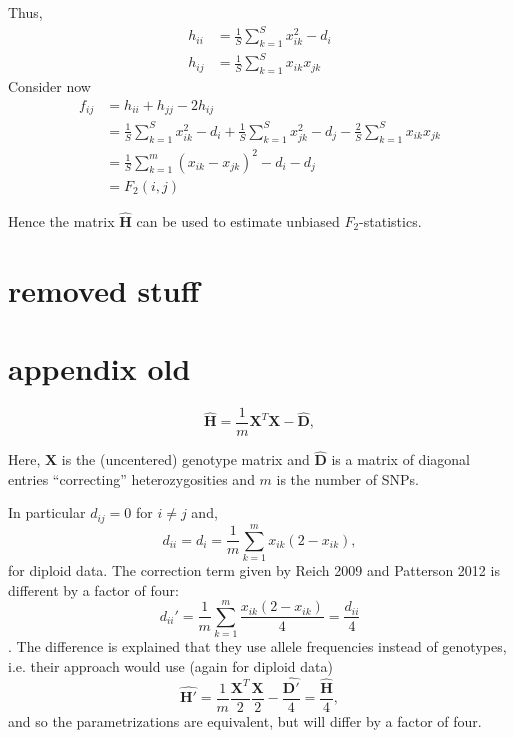 \documentclass[12pt, letterpaper]{article}
\newcommand{\MX}{\mathbf{X}}
\begin{document}
Thus, 
\begin{subequations}\begin{align}
    h_{ii} &= \frac{1}{S}\sum_{k=1}^S x_{ik}^2 - d_i \\
    h_{ij} &= \frac{1}{S}\sum_{k=1}^S x_{ik}x_{jk} 
\end{align}\end{subequations}
Consider now
\begin{align}
    f_{ij} &= h_{ii} + h_{jj} - 2 h_{ij}\nonumber\\
     &= \frac{1}{S}\sum_{k=1}^S x_{ik}^2 - d_i + \frac{1}{S}\sum_{k=1}^S x_{jk}^2 - d_j - \frac{2}{S}\sum_{k=1}^S x_{ik}x_{jk}\nonumber \\
    &= \frac{1}{S} \sum_{k=1}^m (x_{ik} - x_{jk})^2 - d_i - d_j \\
    &= F_2(i,j)\nonumber
\end{align}

Hence the matrix $\hat{\mathbf{H}}$ can be used to estimate unbiased $F_2$-statistics.



\section{removed stuff}

\section{appendix old}
\begin{equation}
    \hat{\mathbf{H}} = \frac{1}{m}\mathbf{X}^T\mathbf{X} - \hat{\mathbf{D}},
\end{equation}

Here, $\MX$ is the (uncentered) genotype matrix and $\hat{\mathbf{D}}$ is a matrix of diagonal entries ``correcting'' heterozygosities and $m$ is the number of SNPs.

In particular $d_{ij} = 0 $ for $i \neq j$ and, 
\begin{equation}
    d_{ii} = d_i = \frac{1}{m}\sum_{k=1}^m x_{ik}(2-x_{ik}),
\end{equation}
for diploid data. The correction term given by Reich 2009 and Patterson 2012 is different by a factor of four:
\begin{equation*}
    d_{ii}' = \frac{1}{m}\sum_{k=1}^m \frac{x_{ik}(2-x_{ik})}{4} = \frac{d_{ii}}{4}
\end{equation*}.
The difference is explained that they use allele frequencies instead of genotypes, i.e. their approach would use (again for diploid data)
\begin{equation*}
    \hat{\mathbf{H}'} = \frac{1}{m}\frac{\mathbf{X}^T}{2}\frac{\mathbf{X}}{2} - \frac{\hat{\mathbf{D'}}}{4} = \frac{\hat{\mathbf{H}}}{4},
\end{equation*}
and so the parametrizations are equivalent, but will differ by a factor of four.
\end{document}
